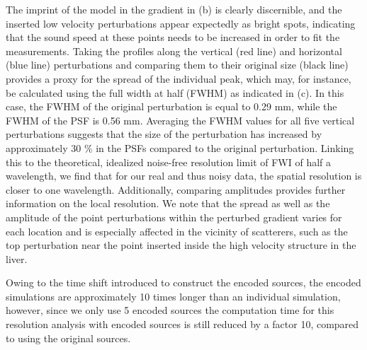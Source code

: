 \documentclass[12pt]{iopart}
\begin{document}
The imprint of the model in the gradient in (b) is clearly discernible, and the inserted low velocity perturbations appear expectedly as bright spots, indicating that the sound speed at these points needs to be increased in order to fit the measurements. Taking the profiles along the vertical (red line) and horizontal (blue line) perturbations and comparing them to their original size (black line) provides a proxy for the spread of the individual peak, which may, for instance, be calculated using the full width at half (FWHM) as indicated in (c). In this case, the FWHM of the original perturbation is equal to 0.29 mm, while the FWHM of the PSF is 0.56 mm. Averaging the FWHM values for all five vertical perturbations suggests that the size of the perturbation has increased by approximately 30 \% in the PSFs compared to the original perturbation. Linking this to the theoretical, idealized noise-free resolution limit of FWI of half a wavelength, we find that for our real and thus noisy data, the spatial resolution is closer to one wavelength. Additionally, comparing amplitudes provides further information on the local resolution. We note that the spread as well as the amplitude of the point perturbations within the perturbed gradient varies for each location and is especially affected in the vicinity of scatterers, such as the top perturbation near the point inserted inside the high velocity structure in the liver.

Owing to the time shift introduced to construct the encoded sources, the encoded simulations are approximately 10 times longer than an individual simulation, however, since we only use 5 encoded sources the computation time for this resolution analysis with encoded sources is still reduced by a factor 10, compared to using the original sources.
    
\end{document}
